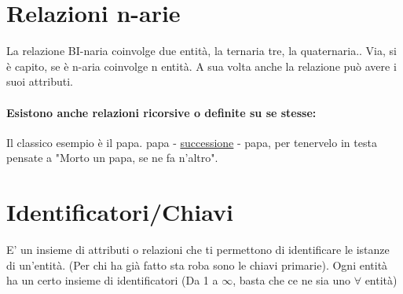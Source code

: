 \documentclass[12pt, a4paper, openany, twoside]{book}
\begin{document}
\section{Relazioni n-arie}
La relazione BI-naria coinvolge due entità, la ternaria tre, la quaternaria.. 
Via, si è capito, se è n-aria coinvolge n entità. A sua volta anche la relazione
può avere i suoi attributi.
\paragraph{Esistono anche relazioni ricorsive o definite su se stesse:} Il classico
esempio è il papa. papa - \underline{successione} - papa, per tenervelo in testa
pensate a "Morto un papa, se ne fa n'altro".
\section{Identificatori/Chiavi}
E' un insieme di attributi o relazioni che ti permettono di identificare le
istanze di un'entità. (Per chi ha già fatto sta roba sono le chiavi primarie).
Ogni entità ha un certo insieme di identificatori (Da 1 a $\infty$, basta che
ce ne sia uno $\forall$ entità)
\end{document}
